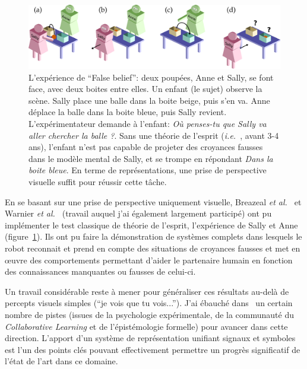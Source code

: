 \documentclass[a4paper]{article}
\newcommand{\etal}{{\textit{et al.~}}}
\newcommand{\ie}{{\textit{i.e.~}}}
\begin{document}
\begin{figure}[h!t]
        \centering
        \includegraphics[width=1.0\linewidth]{sally_ann}
        \caption{\small L'expérience de ``False belief'': deux poupées, Anne
            et Sally, se font face, avec deux boites entre elles. Un enfant
            (le sujet) observe la scène. Sally place une balle dans la boite
            beige, puis s'en va. Anne déplace la balle dans la boite bleue, puis
            Sally revient. L'expérimentateur demande à l'enfant: \emph{Où
            penses-tu que Sally va aller chercher la balle ?}. Sans une théorie
            de l'esprit (\ie, avant 3-4 ans), l'enfant n'est pas capable de
            projeter des croyances fausses dans le modèle mental de Sally, et se
            trompe en répondant \emph{Dans la boite bleue}. En terme de
            représentations, une prise de perspective visuelle suffit pour
            réussir cette tâche.}
        \label{false-beliefs}
\end{figure}

En se basant sur une prise de perspective uniquement visuelle, Breazeal
\etal\cite{breazeal2009embodied} et Warnier \etal\cite{warnier2012when} (travail
auquel j'ai également largement participé) ont pu implémenter le test classique de théorie de
l'esprit, l'expérience de Sally et Anne (figure~\ref{false-beliefs}). Ils ont pu
faire la démonstration de systèmes complets dans lesquels le robot reconnait et
prend en compte des situations de croyances fausses et met en \oe uvre des
comportements permettant d'aider le partenaire humain en fonction des
connaissances manquantes ou fausses de celui-ci.

Un travail considérable reste à mener pour généraliser ces résultats au-delà de
percepts visuels simples (``je vois que tu vois...'').
J'ai ébauché dans~\cite{lemaignan2015mutual} un certain nombre de pistes (issues
de la psychologie expérimentale, de la communauté du \emph{Collaborative
Learning} et de l'épistémologie formelle) pour avancer dans cette direction.
L'apport d'un système de représentation unifiant signaux et symboles est l'un
des points clés pouvant effectivement permettre un progrès significatif de
l'état de l'art dans ce domaine.
\end{document}
